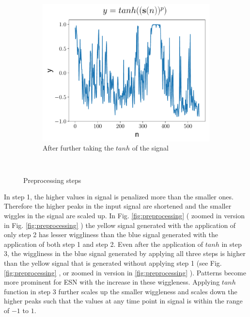 \begin{figure}[h]
\begin{subfigure}[h]{0.5\textwidth}
          \includegraphics[width=\textwidth]{./description/images/tanh}
          \caption{After further taking the $tanh$ of the signal}
          \label{fig:tanh}
      \end{subfigure}\\
      
     
      \caption{Preprocessing steps}\label{fig:animals}
  \end{figure}
  
 In step 1, the higher values in signal is penalized more than the smaller ones. Therefore the higher peaks in the input signal are shortened and the smaller wiggles in the signal are scaled up. In  Fig. \ref{fig:preprocessing}  ( zoomed in version in Fig. \ref{fig:preprocessing} ) the yellow signal generated with the application of only step 2 has lesser wiggliness than the blue signal generated with the application of both step 1 and step 2. Even after the application of $tanh$ in step 3, the wiggliness in the blue signal generated by applying all three steps is higher than the yellow signal that is generated without applying step 1 (see Fig. \ref{fig:preprocessing} , or zoomed in version in \ref{fig:preprocessing}  ). Patterns become more prominent for ESN with the increase in these wiggleness.  Applying $tanh$ function in step 3 further scales up the smaller wiggleness and scales down the higher peaks such that the values at any time point in signal is within the range of $-1$ to $1$.

